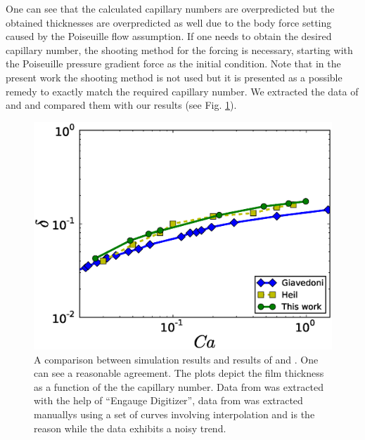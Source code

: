 \documentclass[preprint,12pt]{elsarticle}
\begin{document}
One can see that the calculated
capillary numbers are overpredicted but the obtained thicknesses are overpredicted
as well due to the body force setting caused by the Poiseuille flow assumption. If one
needs to obtain the desired capillary number, the shooting method for the forcing is
necessary, starting with the Poiseuille pressure gradient force as the initial condition. 
{\color{red} Note that in the present work the shooting method is not used but it is presented as
a possible remedy to exactly match the required capillary number.} 
We
extracted
the data of 
\citet{giavedoni-numerical} and \citet{heil-bretherton} and compared them with our results (see 
Fig. \ref{fig:capillary:comparison}).
\begin{figure}
\includegraphics[width=\textwidth]{Figures/Capillary/capillaries_comparison_real.eps}
\caption{A comparison between simulation results and results of
\citet{giavedoni-numerical} and \citet{heil-bretherton}. One can see a
reasonable agreement. The plots depict the film thickness as a function of the
the capillary number. {\color{red} Data from \cite{giavedoni-numerical} was
extracted with the help of ``Engauge Digitizer'', data from
\citet{heil-bretherton} was extracted manuallys using a set of curves involving interpolation and
is the reason while the data exhibits a noisy trend.} \label{fig:capillary:comparison}}
\end{figure}
\end{document}

